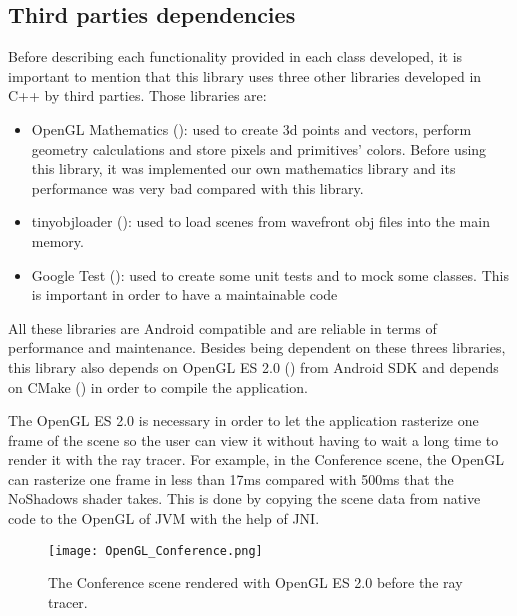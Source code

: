 \subsection{Third parties dependencies}

\par
Before describing each functionality provided in each class developed, it is important to mention that this library uses three other libraries developed in C++ by third parties.
Those libraries are:

\begin{itemize}
	\item OpenGL Mathematics (\cite{GLM}): used to create 3d points and vectors, perform geometry calculations and store pixels and primitives' colors.
	Before using this library, it was implemented our own mathematics library and its performance was very bad compared with this library.
	\item tinyobjloader (\cite{tinyobjloader}): used to load scenes from wavefront obj files into the main memory.
	\item Google Test (\cite{GoogleTest}): used to create some unit tests and to mock some classes.
	This is important in order to have a maintainable code 
\end{itemize}

\par
All these libraries are Android compatible and are reliable in terms of performance and maintenance.
Besides being dependent on these threes libraries, this library also depends on OpenGL ES 2.0 (\cite{OpenGL_ES_2}) from Android SDK and depends on CMake (\cite{CMake}) in order to compile the application.

\par
The OpenGL ES 2.0 is necessary in order to let the application rasterize one frame of the scene so the user can view it without having to wait a long time to render it with the ray tracer.
For example, in the Conference scene, the OpenGL can rasterize one frame in less than 17ms compared with 500ms that the NoShadows shader takes.
This is done by copying the scene data from native code to the OpenGL of JVM with the help of JNI.

\begin{figure}[H]
	\centering
	\caption{The Conference scene rendered with OpenGL ES 2.0 before the ray tracer.}
	\label{The Conference scene rendered with OpenGL ES 2.0 before the ray tracer.}
	\texttt{[image: OpenGL\_Conference.png]}
\end{figure}

